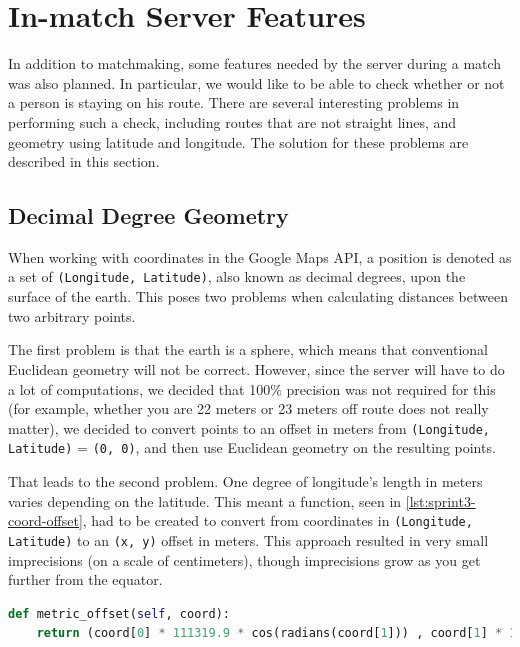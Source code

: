 \section{In-match Server Features}

In addition to matchmaking, some features needed by the server during a match was also planned. In particular, we would like to be able to check whether or not a person is staying on his route. There are several interesting problems in performing such a check, including routes that are not straight lines, and geometry using latitude and longitude. The solution for these problems are described in this section.

\subsection{Decimal Degree Geometry}

When working with coordinates in the Google Maps \ac{API}, a position is denoted as a set of \texttt{(Longitude, Latitude)}, also known as decimal degrees, upon the surface of the earth. This poses two problems when calculating distances between two arbitrary points.

The first problem is that the earth is a sphere, which means that conventional Euclidean geometry will not be correct. However, since the server will have to do a lot of computations, we decided that 100\% precision was not required for this (for example, whether you are 22 meters or 23 meters off route does not really matter), we decided to convert points to an offset in meters from \texttt{(Longitude, Latitude)} = \texttt{(0, 0)}, and then use Euclidean geometry on the resulting points.

That leads to the second problem. One degree of longitude's length in meters varies depending on the latitude\cite{wikidecimaldegrees}. This meant a function, seen in \autoref{lst:sprint3-coord-offset}, had to be created to convert from coordinates in \texttt{(Longitude, Latitude)} to an \texttt{(x, y)} offset in meters. This approach resulted in very small imprecisions (on a scale of centimeters), though imprecisions grow as you get further from the equator.

\begin{lstlisting}[label={lst:sprint3-coord-offset},caption={Convert Decimal Degrees to Offset in Meters},language={Python}]
def metric_offset(self, coord):
	return (coord[0] * 111319.9 * cos(radians(coord[1])) , coord[1] * 111319.9)
\end{lstlisting}

